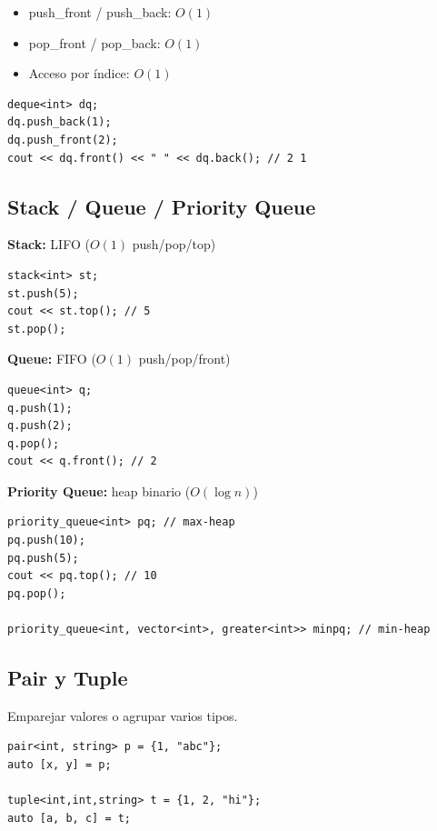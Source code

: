 \documentclass{article}
\begin{document}
\begin{itemize}
  \item push\_front / push\_back: \(O(1)\)
  \item pop\_front / pop\_back: \(O(1)\)
  \item Acceso por índice: \(O(1)\)
\end{itemize}

\begin{lstlisting}[style=cppstyle]
deque<int> dq;
dq.push_back(1);
dq.push_front(2);
cout << dq.front() << " " << dq.back(); // 2 1
\end{lstlisting}


\subsection{Stack / Queue / Priority Queue}

\textbf{Stack:} LIFO (\(O(1)\) push/pop/top)

\begin{lstlisting}[style=cppstyle]
stack<int> st;
st.push(5);
cout << st.top(); // 5
st.pop();
\end{lstlisting}

\textbf{Queue:} FIFO (\(O(1)\) push/pop/front)

\begin{lstlisting}[style=cppstyle]
queue<int> q;
q.push(1);
q.push(2);
q.pop();
cout << q.front(); // 2
\end{lstlisting}

\textbf{Priority Queue:} heap binario (\(O(\log n)\))

\begin{lstlisting}[style=cppstyle]
priority_queue<int> pq; // max-heap
pq.push(10);
pq.push(5);
cout << pq.top(); // 10
pq.pop();

priority_queue<int, vector<int>, greater<int>> minpq; // min-heap
\end{lstlisting}


\subsection{Pair y Tuple}

Emparejar valores o agrupar varios tipos.

\begin{lstlisting}[style=cppstyle]
pair<int, string> p = {1, "abc"};
auto [x, y] = p;

tuple<int,int,string> t = {1, 2, "hi"};
auto [a, b, c] = t;
\end{lstlisting}
\end{document}

